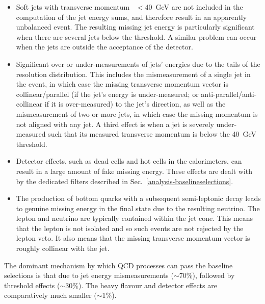 \begin{itemize}
	\item Soft jets with transverse momentum \pt~$<40$~GeV are not included in 
	the computation of the jet energy sums, and therefore result in an 
	apparently unbalanced event.
	The resulting missing jet energy is particularly significant when there are 
	several jets below the \pt threshold. A similar problem can occur when the 
	jets are outside the acceptance of the detector.
	\item Significant over or under-measurements of jets' energies due to the 
	tails of the resolution distribution. This includes the mismeasurement of a 
	single jet in the event, in which case the missing transverse momentum 
	vector is collinear/parallel (if the jet's energy is under-measured; or 
	anti-parallel/anti-collinear
	if it is over-measured) to the jet's direction, as well as the 
	mismeasurement of two or more jets, in which case the missing momentum is 
	not aligned with any jet. A third effect is when a jet is severely 
	under-measured such that its measured transverse momentum is below the 
	40~GeV threshold. 
	\item Detector effects, such as dead cells and hot cells in the 
	calorimeters, can result in a large amount of fake missing energy. These 
	effects are dealt with by the dedicated \met filters described in 
	Sec.~\ref{analysis-baselineselections}.
	\item The production of bottom quarks with a subsequent semi-leptonic decay 
	leads to genuine missing energy in the final state due to the resulting 
	neutrino. The lepton and neutrino are typically contained within the jet 
	cone. This means that the lepton is not isolated and so such events are not 
	rejected by the lepton veto. It also means that the missing transverse 
	momentum vector is roughly collinear with the jet. %
\end{itemize}

The dominant mechanism by which QCD processes can pass the baseline selections 
is that due to jet energy mismeasurements ($\sim$70\%), followed by threshold 
effects ($\sim$30\%). The heavy flavour and detector effects are comparatively 
much smaller ($\sim$1\%).


